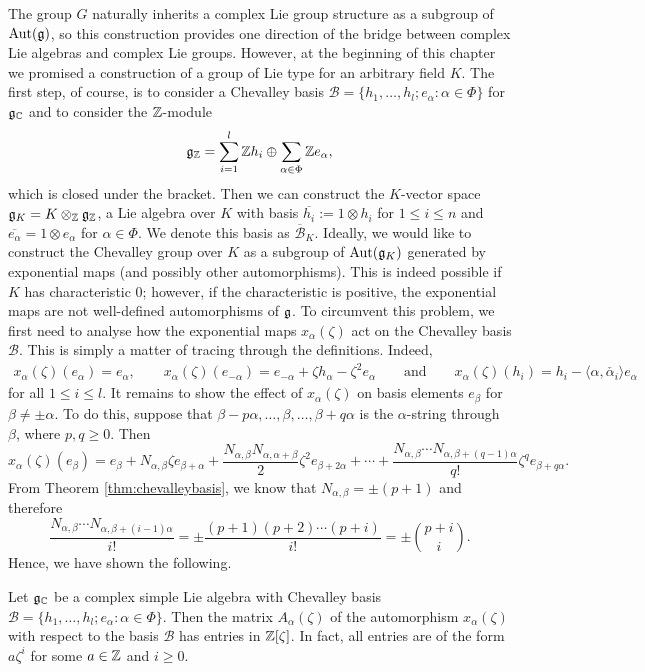 The group $G$ naturally inherits a complex Lie group structure as a subgroup of $\mathrm{Aut}(\mathfrak{g})$, so this construction provides one direction of the bridge between complex Lie algebras and complex Lie groups. However, at the beginning of this chapter we promised a construction of a group of Lie type for an arbitrary field $K$. The first step, of course, is to consider a Chevalley basis $\mathcal{B}=\{h_1,\ldots,h_l;e_\alpha:\alpha\in\Phi\}$ for $\mathfrak{g}_{\mathbb{C}}$ and to consider the $\mathbb{Z}$-module 
$$\mathfrak{g}_{\mathbb{Z}}=\sum_{i=1}^l\mathbb{Z} h_i\oplus\sum_{\alpha\in\Phi}\mathbb{Z} e_\alpha,$$
which is closed under the bracket. Then we can construct the $K$-vector space $\mathfrak{g}_K=K\otimes_{\mathbb{Z}}\mathfrak{g}_{\mathbb{Z}}$, a Lie algebra over $K$ with basis $\overline{h_i}:=1\otimes h_i$ for $1\leq i\leq n$ and $\overline{e_\alpha}=1\otimes e_\alpha$ for $\alpha\in\Phi$. We denote this basis as $\overline{\mathcal{B}}_K$. Ideally, we would like to construct the Chevalley group over $K$ as a subgroup of $\mathrm{Aut}(\mathfrak{g}_K)$ generated by exponential maps (and possibly other automorphisms). This is indeed possible if $K$ has characteristic $0$; however, if the characteristic is positive, the exponential maps are not well-defined automorphisms of $\mathfrak{g}$. To circumvent this problem, we first need to analyse how the exponential maps $x_\alpha(\zeta)$ act on the Chevalley basis $\mathcal{B}$. This is simply a matter of tracing through the definitions. Indeed, 
\begin{align*}
    x_\alpha(\zeta)(e_\alpha)=e_\alpha, \quad\quad x_\alpha(\zeta)(e_{-\alpha})=e_{-\alpha}+\zeta h_\alpha-\zeta^2 e_\alpha\quad\quad\text{and}\quad\quad x_\alpha(\zeta)(h_i)=h_i-\langle\alpha,\check{\alpha_i}\rangle e_\alpha
\end{align*}
for all $1\leq i\leq l$. It remains to show the effect of $x_\alpha(\zeta)$ on basis elements $e_\beta$ for $\beta\neq\pm\alpha$. To do this, suppose that $\beta-p\alpha,\ldots,\beta,\ldots,\beta+q\alpha$ is the $\alpha$-string through $\beta$, where $p,q\geq 0$. Then
$$x_\alpha(\zeta)(e_\beta)=e_\beta+N_{\alpha,\beta}\zeta e_{\beta+\alpha}+\frac{N_{\alpha,\beta}N_{\alpha,\alpha+\beta}}{2}\zeta^2 e_{\beta+2\alpha}+\cdots+\frac{N_{\alpha,\beta}\cdots N_{\alpha,\beta+(q-1)\alpha}}{q!}\zeta^q e_{\beta+q\alpha}.$$
From Theorem \ref{thm:chevalleybasis}, we know that $N_{\alpha,\beta}=\pm(p+1)$ and therefore
$$\frac{N_{\alpha,\beta}\cdots N_{\alpha,\beta+(i-1)\alpha}}{i!}=\pm\frac{(p+1)(p+2)\cdots(p+i)}{i!}=\pm \binom{p+i}{i}.$$
Hence, we have shown the following.
\begin{proposition}
    Let $\mathfrak{g}_{\mathbb{C}}$ be a complex simple Lie algebra with Chevalley basis $\mathcal{B}=\{h_1,\ldots,h_l;e_\alpha:\alpha\in\Phi\}$. Then the matrix $A_\alpha(\zeta)$ of the automorphism $x_\alpha(\zeta)$ with respect to the basis $\mathcal{B}$ has entries in $\mathbb{Z}[\zeta]$. In fact, all entries are of the form $a\zeta^i$ for some $a\in\mathbb{Z}$ and $i\geq0$. 
\end{proposition}

